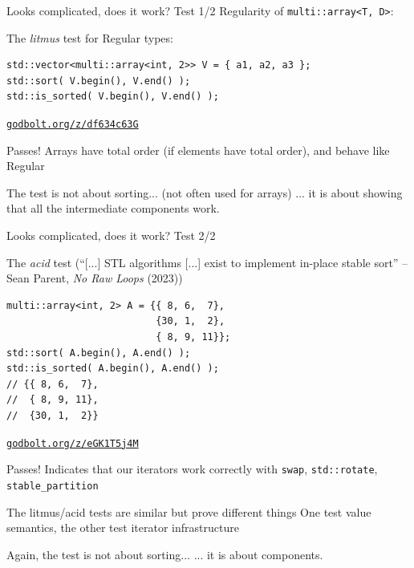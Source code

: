 \documentclass[t,aspectratio=169,handout]{beamer}
\begin{document}
\begin{frame}[fragile]{Looks complicated, does it work? Test 1/2}
Regularity of \lstinline|multi::array<T, D>|:

The \textit{litmus} test for Regular types:
\begin{lstlisting}
std::vector<multi::array<int, 2>> V = { a1, a2, a3 };
std::sort( V.begin(), V.end() );
std::is_sorted( V.begin(), V.end() );
\end{lstlisting}
{\raggedleft\href{https://godbolt.org/z/df634c63G}{\texttt{godbolt.org/z/df634c63G}}\par}

{
\begin{alertblock}{Passes!}
  Arrays have total order (if elements have total order),
  and behave like Regular
\end{alertblock}
}

\begin{alertblock}{The test is not about sorting... (not often used for arrays)}
  ... it is about showing that all the intermediate components work.
\end{alertblock}

\end{frame}

\begin{frame}[fragile]{Looks complicated, does it work? Test 2/2}

The \textit{acid} test (``[...] STL algorithms [...] exist to implement in-place stable sort'' -- Sean Parent, \emph{No Raw Loops} (2023))

\begin{lstlisting}
multi::array<int, 2> A = {{ 8, 6,  7},
                          {30, 1,  2},
                          { 8, 9, 11}};
std::sort( A.begin(), A.end() );
std::is_sorted( A.begin(), A.end() );
// {{ 8, 6,  7},
//  { 8, 9, 11},
//  {30, 1,  2}}
\end{lstlisting}
{\raggedleft\href{https://godbolt.org/z/eGK1T5j4M}{\texttt{godbolt.org/z/eGK1T5j4M}}\par}

{
\begin{alertblock}{Passes!}
  Indicates that our iterators work correctly with \lstinline|swap|, \lstinline|std::rotate|, \lstinline|stable_partition|
\end{alertblock}
}

\begin{alertblock}{The litmus/acid tests are similar but prove different things}
  One test value semantics, the other test iterator infrastructure
\end{alertblock}

\begin{alertblock}{Again, the test is not about sorting...}
  ... it is about components.
\end{alertblock}

\end{frame}
\end{document}
